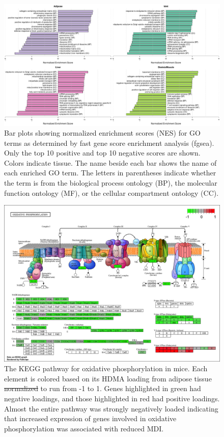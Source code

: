 \documentclass[
]{article}
\providecommand{\DIFaddtex}[1]{{\protect\color{blue}\uwave{#1}}} %
\providecommand{\DIFdeltex}[1]{{\protect\color{red}\sout{#1}}}                      %
\providecommand{\DIFaddFL}[1]{\DIFadd{#1}} %
\providecommand{\DIFdelFL}[1]{\DIFdel{#1}} %
\providecommand{\DIFaddbeginFL}{} %
\providecommand{\DIFaddendFL}{} %
\providecommand{\DIFdelbeginFL}{} %
\providecommand{\DIFdelendFL}{} %
\providecommand{\DIFadd}[1]{\texorpdfstring{\DIFaddtex{#1}}{#1}} %
\providecommand{\DIFdel}[1]{\texorpdfstring{\DIFdeltex{#1}}{}} %
\newcommand{\DIFscaledelfig}{0.5}
\newlength{\DIFdelgraphicswidth} %
\newlength{\DIFdelgraphicsheight} %
\newcommand{\DIFaddincludegraphics}[2][]{{\color{blue}\fbox{\DIFOincludegraphics[#1]{#2}}}} %
\newcommand{\DIFdelincludegraphics}[2][]{%
\sbox{\DIFdelgraphicsbox}{\DIFOincludegraphics[#1]{#2}}%
\settoboxwidth{\DIFdelgraphicswidth}{\DIFdelgraphicsbox} %
\settoboxtotalheight{\DIFdelgraphicsheight}{\DIFdelgraphicsbox} %
\scalebox{\DIFscaledelfig}{%
\parbox[b]{\DIFdelgraphicswidth}{\usebox{\DIFdelgraphicsbox}\\[-\baselineskip] \rule{\DIFdelgraphicswidth}{0em}}\llap{\resizebox{\DIFdelgraphicswidth}{\DIFdelgraphicsheight}{%
\setlength{\unitlength}{\DIFdelgraphicswidth}%
\begin{picture}(1,1)%
\thicklines\linethickness{2pt} %
{\color[rgb]{1,0,0}\put(0,0){\framebox(1,1){}}}%
{\color[rgb]{1,0,0}\put(0,0){\line( 1,1){1}}}%
{\color[rgb]{1,0,0}\put(0,1){\line(1,-1){1}}}%
\end{picture}%
}\hspace*{3pt}}} %
} %
\DeclareRobustCommand{\DIFaddbeginFL}{\DIFOaddbeginFL \let\includegraphics\DIFaddincludegraphics} %
\DeclareRobustCommand{\DIFaddendFL}{\DIFOaddendFL \let\includegraphics\DIFOincludegraphics} %
\DeclareRobustCommand{\DIFdelbeginFL}{\DIFOdelbeginFL \let\includegraphics\DIFdelincludegraphics} %
\DeclareRobustCommand{\DIFdelendFL}{\DIFOaddendFL \let\includegraphics\DIFOincludegraphics} %
\begin{document}
\begin{figure}[ht!]
\includegraphics[width=\textwidth]{Figures/Supp_Fig_enrichments_GO.pdf} 
\caption{Bar plots showing normalized enrichment scores (NES) for GO 
terms as determined by fast gene score enrichment analysis (fgsea). 
Only the top 10 positive and top 10 negative scores are shown. Colors 
indicate tissue. The name beside each bar shows the name of each enriched 
GO term. The letters in parentheses indicate whether the term is from the 
biological process ontology (BP), the molecular function ontology (MF), 
or the cellular compartment ontology (CC).
}
\label{fig:top_enrich_go}
\end{figure}

\begin{figure}[ht!]
\includegraphics[width=\textwidth]{Figures/Supp_Fig_OxPhos.png} 
\caption{The KEGG pathway for oxidative phosphorylation in 
mice. Each element is colored based on its HDMA loading from adipose
tissue \DIFdelbeginFL \DIFdelFL{normalized }\DIFdelendFL \DIFaddbeginFL \DIFaddFL{scaled }\DIFaddendFL to run from -1 to 1. Genes highlighted in green had 
negative loadings, and those highlighted in red had positive loadings. 
Almost the entire pathway was strongly negatively loaded indicating 
that increased expression of genes involved in oxidative phosphorylation
was associated with reduced MDI.
}
\label{fig:oxPhos}
\end{figure}
\end{document}
